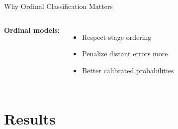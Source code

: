 \documentclass[aspectratio=169, 11pt, t]{beamer}
\begin{document}
\begin{frame}{Why Ordinal Classification Matters}
\begin{columns}[T, onlytextwidth]
            \vspace{0.5em}
            \textbf{Ordinal models:}
            \begin{itemize}
                \item Respect stage ordering
                \item Penalize distant errors more
                \item Better calibrated probabilities
            \end{itemize}
    \end{columns}
\end{frame}

\section{Results}

\end{document}
